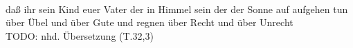 \begin{exe}
\ex \label{ex:T6760} \gll {}                              \\
{daß} {ihr} {sein} {Kind} {euer} {Vater} {der} {in} {Himmel} {sein} {} {der} {der} {Sonne} {auf} {aufgehen} {tun} {über} {Übel} {und} {über} {Gute} {und} {regnen} {über} {Recht} {und} {über} {Unrecht} {}\\
\glt TODO: nhd. Übersetzung (T.32,3)
\end{exe}
